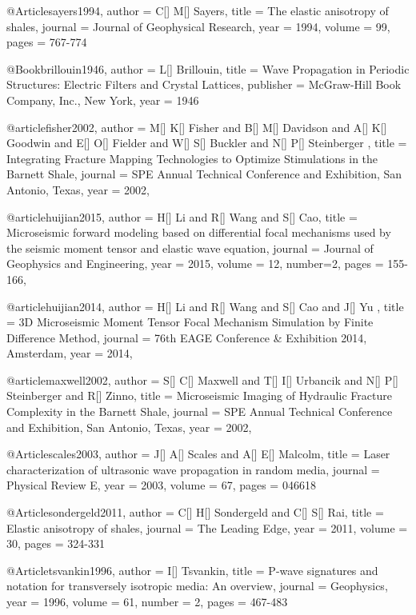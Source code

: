 @Article{sayers1994,
  author = 	 {C[] M[] Sayers},
  title = 	 {The elastic anisotropy of shales},
  journal = 	 {Journal of Geophysical Research},
  year = 	 1994,
  volume = 	 99,
  pages = 	 {767-774}}

@Book{brillouin1946,
  author =	 {L[] Brillouin},
  title =	 {Wave Propagation in Periodic Structures: Electric Filters and Crystal Lattices},
  publisher =	 {McGraw-Hill Book Company, Inc., New York},
  year =	 1946
}

@article{fisher2002,
  author =	 {M[] K[] Fisher and B[] M[] Davidson and  A[] K[]  Goodwin and E[] O[]  Fielder and W[] S[] Buckler and  N[] P[] Steinberger },
  title =	 {Integrating Fracture Mapping Technologies to Optimize Stimulations in the Barnett Shale},
  journal = 	 {SPE Annual Technical Conference and Exhibition, San Antonio, Texas},
  year = 	 2002,
}

@article{huijian2015,
  author =	 {H[] Li and R[] Wang and S[] Cao},
  title =	 {Microseismic forward modeling based on differential focal mechanisms used by the seismic moment tensor and elastic wave equation},
  journal = 	 {Journal of Geophysics and Engineering},
  year = 	 2015,
  volume =	 12,
  number=2,
  pages =	 {155-166},
}



@article{huijian2014,
  author =	 {H[] Li and R[] Wang and S[] Cao and J[] Yu },
  title =	 {3{D} Microseismic Moment Tensor Focal Mechanism Simulation by Finite Difference Method},
  journal = 	 {76th EAGE Conference \& Exhibition 2014, Amsterdam},
  year = 	 2014,
}

@article{maxwell2002,
  author =	 {S[] C[] Maxwell and T[] I[] Urbancik and  N[] P[] Steinberger and R[] Zinno},
  title =	 {Microseismic Imaging of Hydraulic Fracture Complexity in the Barnett Shale},
  journal = 	 {SPE Annual Technical Conference and Exhibition, San Antonio, Texas},
  year = 	 2002,
}


@Article{scales2003,
  author = 	 {J[] A[] Scales and A[] E[] Malcolm},
  title = 	 { Laser characterization of ultrasonic wave propagation in random media},
  journal = 	 {Physical Review E},
  year = 	 2003,
  volume = 	 67,
  pages = 	 {046618}}


@Article{sondergeld2011,
  author = 	 {C[] H[] Sondergeld and C[] S[] Rai},
  title = 	 {Elastic anisotropy of shales},
  journal = 	 {The Leading Edge},
  year = 	 2011,
  volume = 	 30,
  pages = 	 {324-331}}


@Article{tsvankin1996,
  author = 	 {I[] Tsvankin},
  title = 	 {P-wave signatures and notation for transversely isotropic media: An overview},
  journal = 	 {Geophysics},
  year = 	 1996,
  volume = 	 61,
  number = 2,
  pages = 	 {467-483}}


